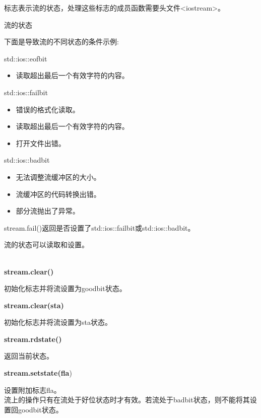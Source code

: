 
标志表示流的状态，处理这些标志的成员函数需要头文件<iostream>。

\begin{center}
流的状态
\end{center}

下面是导致流的不同状态的条件示例:


std::ios::eofbit

\begin{itemize}
\item 
读取超出最后一个有效字符的内容。
\end{itemize}

std::ios::failbit

\begin{itemize}
\item 
错误的格式化读取。

\item 
读取超出最后一个有效字符的内容。

\item 
打开文件出错。
\end{itemize}

std::ios::badbit

\begin{itemize}
\item 
无法调整流缓冲区的大小。

\item 
流缓冲区的代码转换出错。

\item 
部分流抛出了异常。
\end{itemize}

stream.fail()返回是否设置了std::ios::failbit或std::ios::badbit。

流的状态可以读取和设置。

\noindent
\\\textbf{stream.clear()}

初始化标志并将流设置为goodbit状态。

\noindent
\textbf{stream.clear(sta)}

初始化标志并将流设置为sta状态。

\noindent
\textbf{stream.rdstate()}

返回当前状态。

\noindent
\textbf{stream.setstate(fla})

设置附加标志fla。\\

流上的操作只有在流处于好位状态时才有效。若流处于badbit状态，则不能将其设置回goodbit状态。

